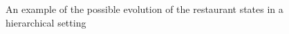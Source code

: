 




\begin{figure}[t] 
	\begin{center}
		\caption{An example of the possible evolution of the restaurant states in a hierarchical setting}
		\label{figResultsCC}
	\end{center} 
\end{figure} 

